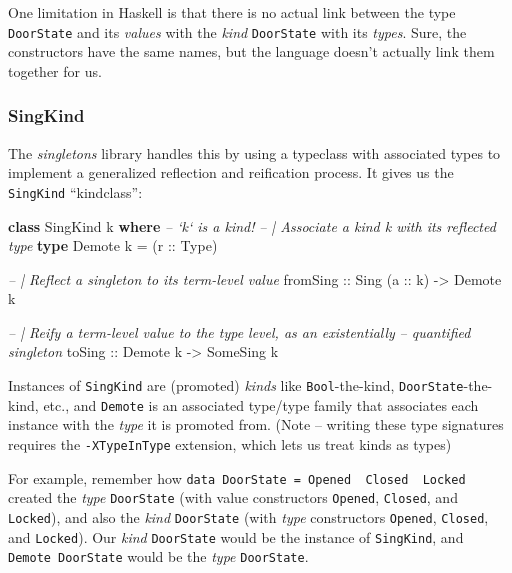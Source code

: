 \documentclass[]{article}
\newenvironment{Shaded}{}{}
\newcommand{\CommentTok}[1]{\textcolor[rgb]{0.38,0.63,0.69}{\textit{#1}}}
\newcommand{\DataTypeTok}[1]{\textcolor[rgb]{0.56,0.13,0.00}{#1}}
\newcommand{\FunctionTok}[1]{\textcolor[rgb]{0.02,0.16,0.49}{#1}}
\newcommand{\KeywordTok}[1]{\textcolor[rgb]{0.00,0.44,0.13}{\textbf{#1}}}
\newcommand{\NormalTok}[1]{#1}
\newcommand{\OtherTok}[1]{\textcolor[rgb]{0.00,0.44,0.13}{#1}}
\begin{document}
One limitation in Haskell is that there is no actual link between the type
\texttt{DoorState} and its \emph{values} with the \emph{kind} \texttt{DoorState}
with its \emph{types}. Sure, the constructors have the same names, but the
language doesn't actually link them together for us.

\hypertarget{singkind}{%
\subsubsection{SingKind}\label{singkind}}

The \emph{singletons} library handles this by using a typeclass with associated
types to implement a generalized reflection and reification process. It gives us
the \texttt{SingKind} ``kindclass'':

\begin{Shaded}
\begin{Highlighting}[]
\KeywordTok{class} \DataTypeTok{SingKind}\NormalTok{ k }\KeywordTok{where}      \CommentTok{-- `k` is a kind!}
    \CommentTok{-- | Associate a kind k with its reflected type}
    \KeywordTok{type} \DataTypeTok{Demote}\NormalTok{ k }\FunctionTok{=}\NormalTok{ (}\OtherTok{r ::} \DataTypeTok{Type}\NormalTok{)}

    \CommentTok{-- | Reflect a singleton to its term-level value}
\OtherTok{    fromSing ::} \DataTypeTok{Sing}\NormalTok{ (}\OtherTok{a ::}\NormalTok{ k) }\OtherTok{->} \DataTypeTok{Demote}\NormalTok{ k}

    \CommentTok{-- | Reify a term-level value to the type level, as an existentially}
    \CommentTok{-- quantified singleton}
\OtherTok{    toSing ::} \DataTypeTok{Demote}\NormalTok{ k }\OtherTok{->} \DataTypeTok{SomeSing}\NormalTok{ k}
\end{Highlighting}
\end{Shaded}

Instances of \texttt{SingKind} are (promoted) \emph{kinds} like
\texttt{Bool}-the-kind, \texttt{DoorState}-the-kind, etc., and \texttt{Demote}
is an associated type/type family that associates each instance with the
\emph{type} it is promoted from. (Note -- writing these type signatures requires
the \texttt{-XTypeInType} extension, which lets us treat kinds as types)

For example, remember how
\texttt{data\ DoorState\ =\ Opened\ \textbar{}\ Closed\ \textbar{}\ Locked}
created the \emph{type} \texttt{DoorState} (with value constructors
\texttt{Opened}, \texttt{Closed}, and \texttt{Locked}), and also the \emph{kind}
\texttt{DoorState} (with \emph{type} constructors
\texttt{\textquotesingle{}Opened}, \texttt{\textquotesingle{}Closed}, and
\texttt{\textquotesingle{}Locked}). Our \emph{kind} \texttt{DoorState} would be
the instance of \texttt{SingKind}, and \texttt{Demote\ DoorState} would be the
\emph{type} \texttt{DoorState}.
\end{document}
